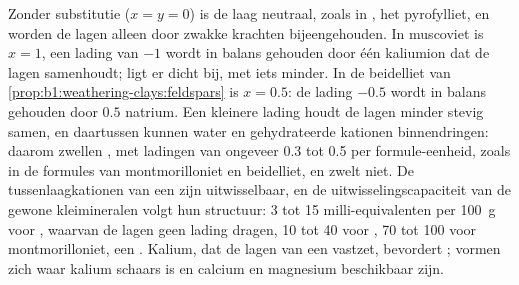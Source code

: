 Zonder substitutie ($x = y = 0$) is de laag neutraal, zoals in , het  pyrofylliet, en worden de lagen alleen door zwakke krachten bijeengehouden.
In muscoviet is $x = 1$, een lading van $-1$ wordt in balans gehouden door één kaliumion dat de lagen samenhoudt;  ligt er dicht bij, met iets minder. In de beidelliet van \cref{prop:b1:weathering-clays:feldspars} is $x = 0.5$: de lading $-0.5$ wordt in balans gehouden door $0.5$ natrium. Een kleinere lading houdt de lagen minder stevig samen, en daartussen kunnen water en gehydrateerde kationen binnendringen: daarom zwellen , met ladingen van ongeveer 0.3 tot 0.5 per formule-eenheid, zoals in de formules van montmorilloniet en beidelliet, en zwelt  niet.
De tussenlaagkationen van een  zijn uitwisselbaar, en de uitwisselingscapaciteit van de gewone kleimineralen volgt hun structuur: 3 tot 15 milli-equivalenten per \qty{100}{g} voor , waarvan de lagen geen lading dragen, 10 tot 40 voor , 70 tot 100 voor montmorilloniet, een . Kalium, dat de lagen van een  vastzet, bevordert ;  vormen zich waar kalium schaars is en calcium en magnesium beschikbaar zijn.

